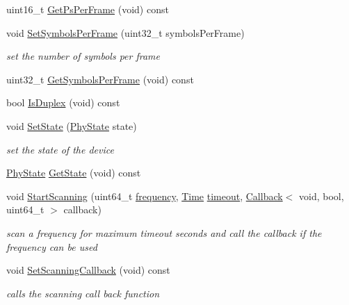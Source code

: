 \begin{DoxyCompactItemize}
uint16\+\_\+t \hyperlink{classns3_1_1WimaxPhy_a008618a1ea56b9cbc4cae7fdbc81ae54}{Get\+Ps\+Per\+Frame} (void) const 
\item 
void \hyperlink{classns3_1_1WimaxPhy_a6a87ab2655e031f93c22c68d7a2f6337}{Set\+Symbols\+Per\+Frame} (uint32\+\_\+t symbols\+Per\+Frame)
\begin{DoxyCompactList}\small\item\em set the number of symbols per frame \end{DoxyCompactList}\item 
uint32\+\_\+t \hyperlink{classns3_1_1WimaxPhy_a74c2f6e57e1cf2c2bf403371c67cc49e}{Get\+Symbols\+Per\+Frame} (void) const 
\item 
bool \hyperlink{classns3_1_1WimaxPhy_a14feaf88ff5560e1c15c978bcc8147e4}{Is\+Duplex} (void) const 
\item 
void \hyperlink{classns3_1_1WimaxPhy_abb3acfe9ecda0e5a44275fdb3e4ccf5c}{Set\+State} (\hyperlink{classns3_1_1WimaxPhy_a9cc75c9e84f88fc3064bba918eee1f78}{Phy\+State} state)
\begin{DoxyCompactList}\small\item\em set the state of the device \end{DoxyCompactList}\item 
\hyperlink{classns3_1_1WimaxPhy_a9cc75c9e84f88fc3064bba918eee1f78}{Phy\+State} \hyperlink{classns3_1_1WimaxPhy_af51560fc904a23bd05355e1a75c16109}{Get\+State} (void) const 
\item 
void \hyperlink{classns3_1_1WimaxPhy_a5c698b7cd87044b36b68b19d509acdf0}{Start\+Scanning} (uint64\+\_\+t \hyperlink{mmwave_2model_2fading-traces_2fading__trace__generator_8m_a09045328d6d7e16aa4013f526cc6993d}{frequency}, \hyperlink{classns3_1_1Time}{Time} \hyperlink{openflow-switch_8cc_a386d174ae121d1cfa279074b7e209714}{timeout}, \hyperlink{classns3_1_1Callback}{Callback}$<$ void, bool, uint64\+\_\+t $>$ callback)
\begin{DoxyCompactList}\small\item\em scan a frequency for maximum timeout seconds and call the callback if the frequency can be used \end{DoxyCompactList}\item 
void \hyperlink{classns3_1_1WimaxPhy_a2b6548b7387a2975fde4b34750f50c17}{Set\+Scanning\+Callback} (void) const 
\begin{DoxyCompactList}\small\item\em calls the scanning call back function \end{DoxyCompactList}\item 

\end{DoxyCompactItemize}
